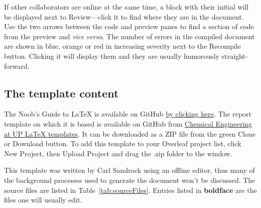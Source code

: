 \documentclass[a4paper,12pt]{article}
\begin{document}
If other collaborators are online at the same time, a block with their initial will be displayed next to Review---click it to find where they are in the document. Use the two arrows between the code and preview panes to find a section of code from the preview and \textit{vice versa}. The number of errors in the compiled document are shown in blue, orange or red in increasing severity next to the Recompile button. Clicking it will display them and they are usually humorously straight-forward.

\subsection{The template content}
The Noob's Guide to \LaTeX{} is available on GitHub \href{https://github.com/Franco-Pretorius/Noob-s-Guide-to-LaTeX}{by clicking here}.
The report template on which it is based is available on GitHub from \href{https://github.com/ChemEngUP/ce-up-latex-templates}{Chemical Engineering at UP LaTeX templates}. It can be downloaded as a ZIP file from the green Clone or Download button. To add this template to your Overleaf project list, click New Project, then Upload Project and drag the .zip folder to the window.

This template was written by Carl Sandrock using an offline editor, thus many of the background processes used to generate the document won't be discussed. The source files are listed in Table~\ref{tab:sourceFiles}. Entries listed in \textbf{boldface} are the files one will usually edit. 
\end{document}
